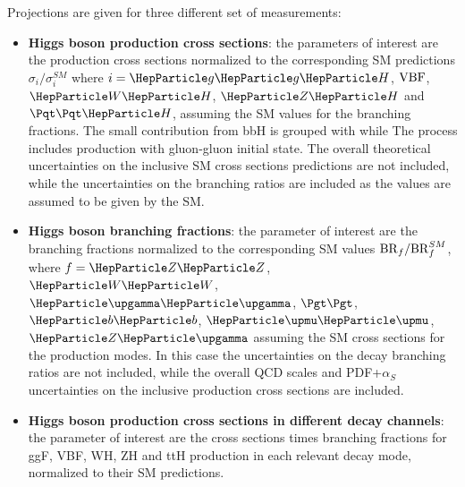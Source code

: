 
Projections are given for three different set of measurements:
\begin{itemize}
    \item \textbf{Higgs boson production cross sections}:  the parameters of interest are the production cross sections normalized to the corresponding SM predictions  $\sigma_{i}/\sigma_{i}^{SM}$  where $i=\ggh$, $\mathrm{VBF}$, $\wh$, $\zh$ and $\tth$, assuming the SM values for the branching fractions. The small contribution from bbH is grouped with \ggh while The \zh process includes \zh production with gluon-gluon initial state. The overall theoretical  uncertainties on the inclusive SM cross sections predictions are not included, while the uncertainties on the branching ratios are included as the values are assumed to be given by the SM.
    \item \textbf{Higgs boson branching fractions}: the parameter of interest are the branching fractions normalized to the corresponding SM values ${\rm BR}_{f}/{\rm BR}_{f}^{SM}$, where $f = \zz$, $\ww$, $\PGg\PGg$, $\tautau$, $\bb$, $\mumu$, $\PZ\PGg$ assuming the SM cross sections for the production modes. In this case  the uncertainties on the decay branching ratios are not included, while the overall QCD scales and PDF+$\alpha_{S}$ uncertainties on the inclusive production cross sections are included.
    \item \textbf{Higgs boson production cross sections in different decay channels}: the parameter of interest are the cross sections times branching fractions for ggF, VBF, WH, ZH and ttH production in each relevant decay mode, normalized to their SM predictions.
\end{itemize}



